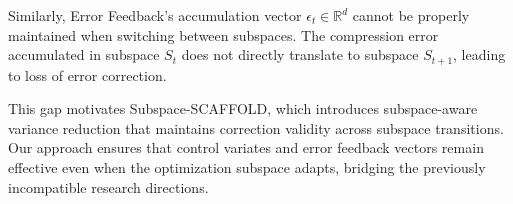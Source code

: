 Similarly, Error Feedback's accumulation vector $\epsilon_t \in \mathbb{R}^d$ cannot be properly maintained when switching between subspaces. The compression error accumulated in subspace $S_t$ does not directly translate to subspace $S_{t+1}$, leading to loss of error correction.

This gap motivates Subspace-SCAFFOLD, which introduces subspace-aware variance reduction that maintains correction validity across subspace transitions. Our approach ensures that control variates and error feedback vectors remain effective even when the optimization subspace adapts, bridging the previously incompatible research directions.